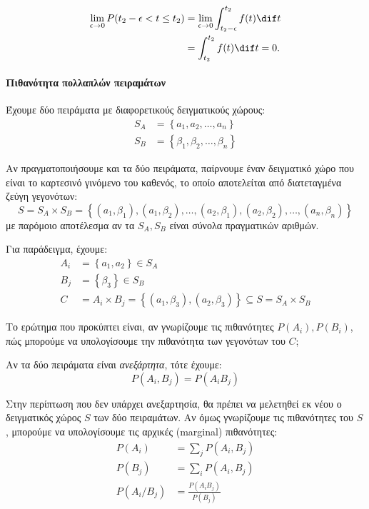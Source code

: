 \documentclass[11pt,a4paper,notitlepage,fleqn,final]{article}
\begin{document}
	\begin{align*}
		\lim_{\epsilon\to 0} P(t_2-\epsilon < t \leq t_2) &=
		\lim_{\epsilon\to 0} \int_{t_2-\epsilon}^{t_2} f(t)\dif t
		\\ &= \int_{t_2}^{t_2} f(t)\dif t = 0.
	\end{align*}

	\paragraph{Πιθανότητα πολλαπλών πειραμάτων}
	Έχουμε δύο πειράματα με διαφορετικούς δειγματικούς χώρους:
	\begin{align*}
		S_A &= \left\lbrace a_1,a_2,\dots,a_n \right\rbrace \\
		S_B &= \left\lbrace \beta_1,\beta_2,\dots,\beta_n \right\rbrace
	\end{align*}

	Αν πραγματοποιήσουμε και τα δύο πειράματα, παίρνουμε έναν δειγματικό
	χώρο που είναι το καρτεσινό γινόμενο του καθενός, το οποίο
	αποτελείται από διατεταγμένα ζεύγη γεγονότων:
	\[
	S = S_A \times S_B = \left\lbrace
	(a_1,\beta_1),(a_1,\beta_2),\dots,(a_2,\beta_1),(a_2,\beta_2),\dots,
	(a_n,\beta_n)
	 \right\rbrace
	\]
	με παρόμοιο αποτέλεσμα αν τα \( S_A,S_B \) είναι σύνολα πραγματικών
	αριθμών.

	Για παράδειγμα, έχουμε:
	\begin{align*}
		A_i &= \left\lbrace a_1,a_2 \right\rbrace \in S_A \\
		B_j &= \left\lbrace \beta_3 \right\rbrace \in S_B \\
		C &= A_i \times B_j = \left\lbrace
		(a_1,\beta_3),(a_2,\beta_3) \right\rbrace \subseteq S = S_A \times S_B
	\end{align*}

	Το ερώτημα που προκύπτει είναι, αν γνωρίζουμε τις πιθανότητες
	\( P(A_i), P(B_i) \), πώς μπορούμε να υπολογίσουμε την πιθανότητα
	των γεγονότων του \( C \);

	Αν τα δύο πειράματα είναι \textit{ανεξάρτητα}, τότε έχουμε:
	\[
	P(A_i,B_j) = P(A_iB_j)
	\]

	Στην περίπτωση που δεν υπάρχει ανεξαρτησία, θα πρέπει να μελετηθεί
	εκ νέου ο δειγματικός χώρος \( S \) των δύο πειραμάτων. Αν όμως
	γνωρίζουμε τις πιθανότητες του \( S \), μπορούμε να υπολογίσουμε
	τις αρχικές (marginal) πιθανότητες:
	\begin{align*}
		P(A_i) &= \sum_j P(A_i, B_j) \\
		P(B_j) &= \sum_i P(A_i, B_j) \\
		P(A_i/B_j) &= \frac{P(A_iB_j)}{P(B_j)}
	\end{align*}
\end{document}

